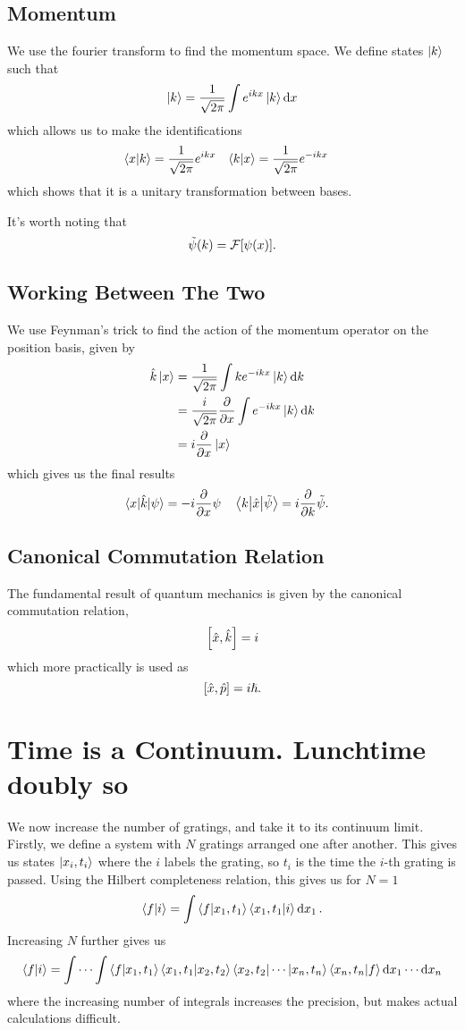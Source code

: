 \documentclass[]{scrreprt}
\renewcommand\hbar\hslash
\begin{document}
\subsection{Momentum}
We use the fourier transform to find the momentum space.
We define states \(\ket{k}\) such that \[ \ket{k} = \frac{1}{\sqrt{2\pi}} \int e^{ikx} \ket{k} \dd{x}\] which allows us to make the identifications
\begin{align*}
  \braket{x}{k} &= \frac{1}{\sqrt{2\pi}}e^{ikx} & \braket{k}{x} &= \frac{1}{\sqrt{2\pi}}e^{-ikx}
\end{align*}
which shows that it is a unitary transformation between bases.

It's worth noting that \[ \tilde\psi(k) = \mathcal{F}\qty[\psi(x)].\]

\subsection{Working Between The Two}
We use Feynman's trick to find the action of the momentum operator on the position basis, given by
\begin{align*}
  \hat{k} \ket{x} &= \frac{1}{\sqrt{2\pi}} \int k e^{-ikx} \ket{k} \dd{k}\\
  &= \frac{i}{\sqrt{2\pi}} \pdv{x} \int e^{-ikx} \ket{k} \dd{k}\\
  &= i \pdv{x} \ket{x}
\end{align*}
which gives us the final results
\begin{align*}
  \mel{x}{\hat{k}}{\psi} &= -i\pdv{x} \psi & \mel{k}{\hat{x}}{\tilde\psi} &= i\pdv{k}\tilde\psi.
\end{align*}

\subsection{Canonical Commutation Relation}
The fundamental result of quantum mechanics is given by the canonical commutation relation, \[ \commutator{\hat{x}}{\hat{k}} = i \] which more practically is used as \[\commutator{\hat{x}}{\hat{p}} = i\hbar. \]

\section{Time is a Continuum. Lunchtime doubly so}
We now increase the number of gratings, and take it to its continuum limit.
Firstly, we define a system with \(N\) gratings arranged one after another.
This gives us states \( \ket{x_i, t_i} \) where the \(i\) labels the grating, so \(t_i\) is the time the \(i\)-th grating is passed.
Using the Hilbert completeness relation, this gives us for \(N=1\) \[\braket{f}{i} = \int \braket{f}{x_1,t_1} \braket{x_1,t_1}{i}\dd{x_1}.\]
Increasing \(N\) further gives us \[\braket{f}{i} = \idotsint \braket{f}{x_1,t_1} \braket{x_1,t_1}{x_2,t_2} \bra{x_2, t_2}\cdots\ket{x_n,t_n}\braket{x_n, t_n}{f}\dd{x_1}\cdots\dd{x_n}\] where the increasing number of integrals increases the precision, but makes actual calculations difficult.
\end{document}
